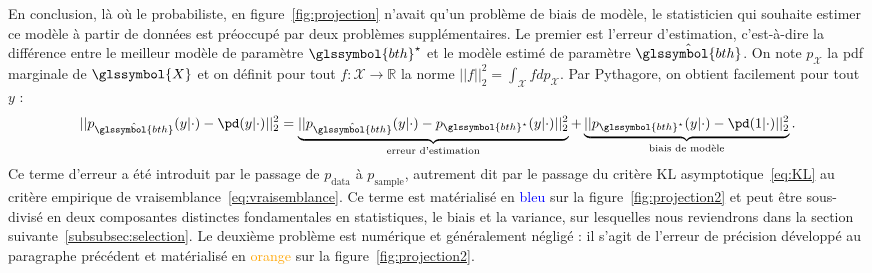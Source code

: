 En conclusion, là où le probabiliste, en figure~\ref{fig:projection} n'avait qu'un problème de biais de modèle, le statisticien qui souhaite estimer ce modèle à partir de données est préoccupé par deux problèmes supplémentaires. Le premier est l'erreur d'estimation, c'est-à-dire la différence entre le meilleur modèle de paramètre $\glssymbol{bth}^\star$ et le modèle estimé de paramètre $\hat{\glssymbol{bth}}$. On note $p_{\mathcal{X}}$ la \gls{pdf} marginale de $\glssymbol{X}$ et on définit pour tout $f: \mathcal{X} \to \mathbb{R}$ la norme $||f||_2^2 = \int_{\mathcal{X}} f dp_{\mathcal{X}}$. Par Pythagore, on obtient facilement pour tout $y$ :
\begin{equation} \label{eq:biais_variance}
||p_{\hat{\glssymbol{bth}}}(y|\cdot) - \pd(y|\cdot)||_2^2 = \underbrace{||p_{\hat{\glssymbol{bth}}}(y|\cdot) - p_{\glssymbol{bth}^\star}(y|\cdot)||_2^2}_{\text{erreur d'estimation}} + \underbrace{||p_{\glssymbol{bth}^\star}(y|\cdot) - \pd(1|\cdot)||_2^2}_{\text{biais de modèle}}.
\end{equation}
Ce terme d'erreur a été introduit par le passage de $p_{\text{data}}$ à $p_{\text{sample}}$, autrement dit par le passage du critère KL asymptotique~\eqref{eq:KL} au critère empirique de vraisemblance~\eqref{eq:vraisemblance}. Ce terme est matérialisé en \textcolor{blue}{bleu} sur la figure~\ref{fig:projection2} et peut être sous-divisé en deux composantes distinctes fondamentales en statistiques, le biais et la variance, sur lesquelles nous reviendrons dans la section suivante~\ref{subsubsec:selection}. Le deuxième problème est numérique et généralement négligé : il s'agit de l'erreur de précision développé au paragraphe précédent et matérialisé en \textcolor{orange}{orange} sur la figure~\ref{fig:projection2}.

